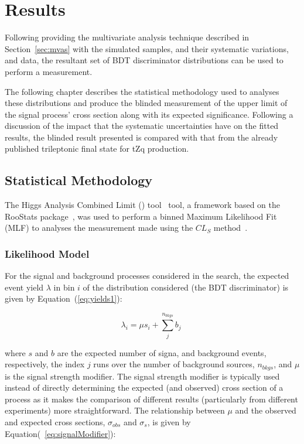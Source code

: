 \chapter{Results}\label{chapter:results}
Following providing the multivariate analysis technique described in Section~\ref{sec:mvas} with the simulated samples, and their systematic variations, and data, the resultant set of BDT discriminator distributions can be used to perform a measurement.

The following chapter describes the statistical methodology used to analyses these distributions and produce the blinded measurement of the upper limit of the signal process' cross section along with its expected significance.
Following a discussion of the impact that the systematic uncertainties have on the fitted results, the blinded result presented is compared with that from the already published trileptonic final state for tZq production.

\section{Statistical Methodology}\label{sec:statisticalModel}
The Higgs Analysis Combined Limit (\combine) tool~\cite{Combine} tool, a framework based on the RooStats package~\cite{Moneta:2010pm,Schott:2012zb}, was used to perform a binned Maximum Likelihood Fit (MLF) to analyses the measurement made using the $CL_{S}$ method~\cite{CMS-NOTE-2011-005,Khachatryan:2014jba,AsymptoticFormulae}.

\subsection{Likelihood Model}\label{subsec:likelihoodModel}
For the signal and background processes considered in the search, the expected event yield $\lambda$ in bin $i$ of the distribution considered (\ie the BDT discriminator) is given by Equation~(\ref{eq:yields1}):

\begin{equation}
\lambda_{i} = \mu s_{i} + \sum\limits_{j}^{n_{bkgs}} b_{j} \;
\label{eq:yields1}
\end{equation}

where $s$ and $b$ are the expected number of signa, and background events, respectively, the index $j$ runs over the number of background sources, $n_{bkgs}$, and $\mu$ is the signal strength modifier.
The signal strength modifier is typically used instead of directly determining the expected (and observed) cross section of a process as it makes the comparison of different results (particularly from different experiments) more straightforward. 
The relationship between $\mu$ and the observed and expected cross sections, $\sigma_{obs}$ and $\sigma_{s}$, is given by Equation(~\ref{eq:signalModifier}):

